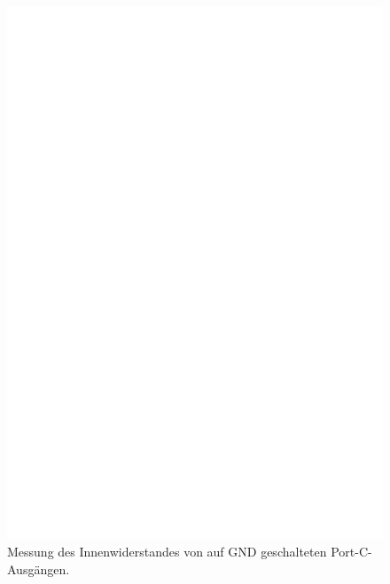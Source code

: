 \begin{enumerate}
\begin{figure}[H]
\includegraphics[]{../FIG/Test7.eps}
\caption{Messung des Innenwiderstandes von auf GND geschalteten Port-C-Ausg\"angen.}
\label{fig:test7}
\end{figure}


\end{enumerate}
